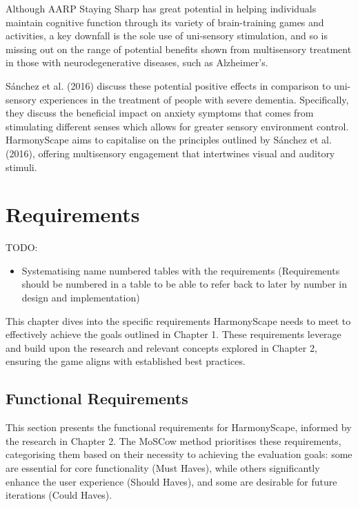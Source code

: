 \documentclass{l4proj}
\begin{document}
Although AARP Staying Sharp has great potential in helping individuals maintain cognitive function through its variety of brain-training games and activities, a key downfall is the sole use of uni-sensory stimulation, and so is missing out on the range of potential benefits shown from multisensory treatment in those with neurodegenerative diseases, such as Alzheimer's.

Sánchez et al. (2016) discuss these potential positive effects in comparison to uni-sensory experiences in the treatment of people with severe dementia. Specifically, they discuss the beneficial impact on anxiety symptoms that comes from stimulating different senses which allows for greater sensory environment control. HarmonyScape aims to capitalise on the principles outlined by Sánchez et al. (2016), offering multisensory engagement that intertwines visual and auditory stimuli.


\chapter{Requirements}

TODO:
\begin{itemize}
    \item Systematising name numbered tables with the requirements (Requirements should be numbered in a table to be able to refer back to later by number in design and implementation)
\end{itemize}

This chapter dives into the specific requirements HarmonyScape needs to meet to effectively achieve the goals outlined in Chapter 1. These requirements leverage and build upon the research and relevant concepts explored in Chapter 2, ensuring the game aligns with established best practices.


\section{Functional Requirements}
This section presents the functional requirements for HarmonyScape, informed by the research in Chapter 2. The MoSCow method prioritises these requirements, categorising them based on their necessity to achieving the evaluation goals: some are essential for core functionality (Must Haves), while others significantly enhance the user experience (Should Haves), and some are desirable for future iterations (Could Haves).
\end{document}
